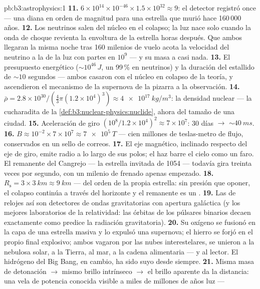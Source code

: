\begin{solution}{pb:b3:astrophysics:1}
\textbf{11.} $6\times10^{14}\times10^{-46}\times1.5\times
10^{32} \approx 9$: el detector registró once --- una
diana en orden de magnitud para una estrella que murió hace 160\,000
años.
\textbf{12.} Los neutrinos salen del núcleo en el colapso; la
luz nace solo cuando la onda de choque revienta la envoltura de la
estrella horas después. Que ambos llegaran la misma noche tras
160 milenios de vuelo acota la velocidad del neutrino a la de la luz
con partes en $10^{9}$ --- y su masa a casi nada.
\textbf{13.} El presupuesto energético ($\sim10^{46}\,\unit{J}$, un 99\,\%
en neutrinos) y la duración del estallido de ${\sim}10$ segundos ---
ambos casaron con el núcleo en colapso de la teoría, y ascendieron el
mecanismo de la supernova de la pizarra a la observación.
\textbf{14.} $\bar\rho = 2.8\times10^{30}/(\tfrac43\pi
(1.2\times10^4)^3) \approx \qty{4e17}{kg/m^3}$: la densidad
nuclear --- la cucharadita de la \cref{def:b3:nuclear-physics:nuclide},
ahora del tamaño de una ciudad.
\textbf{15.} Aceleración de giro $(10^8/1.2\times10^4)^2 \approx
7\times10^{7}$: 30 días $\to$ ${\sim}\qty{40}{ms}$.
\textbf{16.} $B \approx 10^{-2}\times7\times10^{7} \approx
\qty{7e5}{T}$ --- cien millones de teslas-metro de flujo,
conservados en un sello de correos.
\textbf{17.} El eje magnético, inclinado respecto del eje de giro,
emite radio a lo largo de sus polos; el haz barre el cielo como un
faro. El remanente del Cangrejo --- la estrella invitada de 1054 --- todavía
gira treinta veces por segundo, con un milenio de frenado apenas
empezado.
\textbf{18.} $R_{\text{s}} = 3\times\qty{3}{km} \approx
\qty{9}{km}$ --- del orden de la propia estrella: sin
presión que oponer, el colapso continúa a través del horizonte
y el remanente es un .
\textbf{19.} Las  de relojes así son detectores de ondas
gravitatorias con apertura galáctica (y los mejores laboratorios
de la relatividad: las órbitas de los púlsares binarios decaen exactamente como
predice la radiación gravitatoria).
\textbf{20.} Su oxígeno se fusionó en la capa de una estrella masiva
y lo expulsó una supernova; el hierro se forjó en el
propio final explosivo; ambos vagaron por las nubes interestelares,
se unieron a la nebulosa solar, a la Tierra, al mar, a la cadena alimentaria
--- y al lector. El hidrógeno del Big Bang, en cambio, ha sido
suyo desde siempre.
\textbf{21.} Misma masa de detonación $\to$ mismo brillo
intrínseco $\to$ el brillo aparente da la distancia: una vela
de potencia conocida visible a miles de millones de años luz ---

\end{solution}
